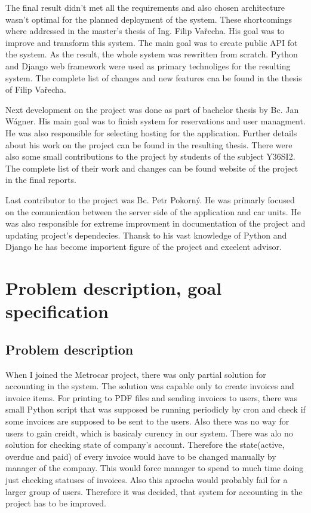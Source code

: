 \documentclass[11pt,twoside,a4paper]{book}
\begin{document}
The final result didn't met all the requirements and also chosen architecture
wasn't optimal for the planned deployment of  the system. These shortcomings
where addressed in the master's thesis of Ing. Filip Vařecha. His goal was to
improve and transform this system.  The main goal was to create public API fot
the system. As the result, the whole system was rewritten  from scratch.
Python and Django web framework were used as primary technoliges for the
resulting system. The complete list  of changes and new features cna be found
in the thesis of Filip Vařecha\cite{Varech10}. 

Next development on the project was done as part of bachelor thesis by Bc. Jan Wágner. His main goal was to 
finish system for reservations and user managment. He was also responsible for selecting hosting for the application. 
Further details about his work on the project can be found in the resulting thesis\cite{WagneJan}. There were also some 
small contributions to the project by students of the subject Y36SI2. The complete list of their work and changes can be found 
website of the project in the final reports\cite{assembla}. 

Last contributor to the project was Bc. Petr Pokorný. He was primarly focused on the comunication between the server side of the application and car units. He was also responsible for extreme improvment in documentation of the project and updating 
project's dependecies. Thansk to his vast knowledge of Python and Django he has become importent figure of the project 
and excelent advisor. 

\chapter{Problem description, goal specification}
\section{Problem description}
When I joined the Metrocar project, there was only partial solution for accounting in the system. The solution was capable only to create invoices and invoice items. For printing to PDF files and sending invoices to users, there was small Python script that was supposed be running periodicly by cron and check if some invoices are supposed to be sent to the users. Also there was no way for users to gain creidt, which is basicaly curency in our system. There was alo no solution for checking 
state of company's account. Therefore the state(active, overdue and paid) of every invoice would have to be changed manually by manager of the company. This would force manager to spend to much time doing just checking statuses of invoices. Also this 
aprocha would probably fail for a larger group of users. Therefore it was decided, that system for accounting in the project 
has to be improved.
\end{document}
